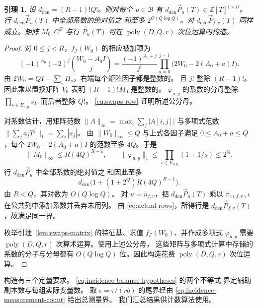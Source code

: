 \documentclass[11pt,reqno]{amsart}
\numberwithin{equation}{section}
\newtheorem{lemma}[theorem]{引理}
\theoremstyle{definition}\newtheorem{definition}[theorem]{定义}
\theoremstyle{remark}\newtheorem{remark}[theorem]{注}
\newcommand{\poly}{\operatorname{poly}}
\renewcommand{\le}{\leqslant}
\begin{document}
\begin{lemma}\label{lem:row-coefficients}
设 $d_{\mathrm{den}}=(R-1)!Q!$。则对每个 $u\in\mathcal B$
有 $d_{\mathrm{den}}\vec{P}_u(T)\in\mathbb Z[T]^{1\times D}$。
行 $d_{\mathrm{den}}\vec{P}_u(T)$ 中全部系数的绝对值之
和至多 $2^{O(Q\log Q)}$。对 $d_{\mathrm{den}}\vec{P}_{f,v}(T)$
同样成立。矩阵 $M_0,C^{\mathcal B}$ 与行 $\vec{P}_u(T)$
可在 $\poly(D,Q,r)$ 次位运算内构造。
\end{lemma}
\begin{proof}
对 $0\le j<R$，$f_{\mathcal I}(W_0)$ 的相应被加项为
\[
 (-1)^{A_0}(-2)^j\binom{W_0-A_0I}{j}
 =\frac{(-1)^{A_0+j}}{j!}
   \prod_{a=0}^{j-1}\bigl(2W_0-2(A_0+a)I\bigr).
\]
由 $2W_0=QI-\sum_s\Pi_s$，右端每个矩阵因子都是整数的。
且 $j!$ 整除 $(R-1)!$。
因此乘以置换矩阵 $V_0$ 表明 $(R-1)!M_0$ 是整数的。
$\varphi_{u,y}$ 的系数的分母整除
$\prod_{s\in E_{u,y}}s$，而后者整除 $Q!$。
\eqref{eq:swaps-row} 证明所述公分母。

对系数估计，用矩阵范数
$\|A\|_\infty=\max_i\sum_j|A[i,j]|$
与多项式范数 $\|\sum_j a_jT^j\|_1=\sum_j|a_j|$。
由 $\|W_0\|_\infty\le Q$ 与上式各因子满足
$0\le A_0+a\le Q$，每个 $2W_0-2(A_0+a)I$
的范数至多 $4Q$。于是
\[
 \|M_0\|_\infty\le R(4Q)^{R-1},\qquad
 \|\varphi_{u,y}\|_1
 \le\prod_{s\in E_{u,y}}(1+1/s)\le2^Q.
\]
行 $d_{\mathrm{den}}\vec{P}_u$ 中全部系数的绝对值之
和因此至多
\[
 d_{\mathrm{den}}\bigl(1+(1+2^Q)R(4Q)^{R-1}\bigr).
\]
由 $R<Q$，其对数为 $O(Q\log Q)$。
对 $u=u_{f,v}$，把 $d_{\mathrm{den}}\vec{P}_u(T)$
乘以 $\pi_{c(f,v)}\iota$ 在公共列中添加系数并丢弃未用列。
由 \eqref{eq:actual-rows}，所得行是
$d_{\mathrm{den}}\vec{P}_{f,v}(T)$，故满足同一界。

枚举引理~\ref{lem:swaps-matrix} 的特征基、求值
$f_{\mathcal I}(W_0)$、并作成多项式 $\varphi_{u,y}$
需要 $\poly(D,Q,r)$ 次算术运算。使用上述公分母，
这些矩阵与多项式计算中存储的系数的分子与分母都有
$O(Q\log Q)$ 位。因此构造花费 $\poly(D,Q,r)$
次位运算。
\end{proof}

构造有三个定量要求。
\eqref{eq:incidence-balance-hypotheses} 的两个不等式
界定辅助副本数与每组实际变量数。
取 $\epsilon=\tau/(rb)$ 的尾界经由
\eqref{eq:incidence-measurement-count} 给出总测量界。
我们汇总结果供计数算法使用。
\end{document}
